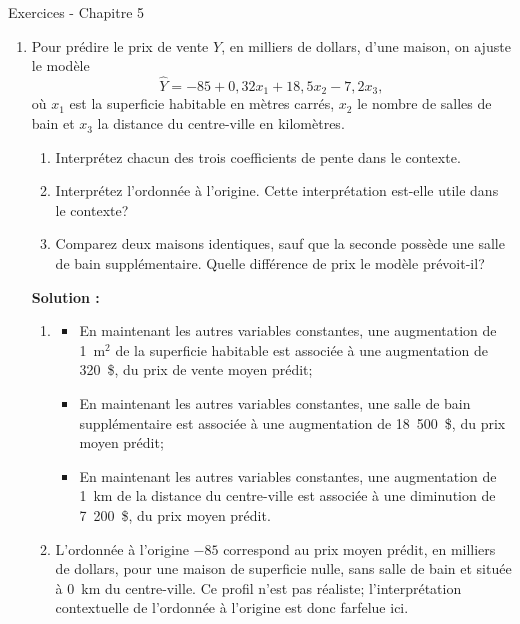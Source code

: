 \documentclass[letter, 11pt]{article}
\newcommand{\prof}[1]{\ifdefined\avecsolutions\par{\color{blue}\textbf{Solution :} #1}\par\fi}
\begin{document}
\vspace*{0.01 cm}
\begin{center}
{\Large Exercices - Chapitre 5}
\end{center}




\begin{enumerate}[leftmargin=*, wide, label=\bf Exercice \arabic*:]

\item Pour prédire le prix de vente $Y$, en milliers de dollars, d'une maison, on
ajuste le modèle
\[
  \widehat{Y}=-85+0{,}32x_1+18{,}5x_2-7{,}2x_3,
\]
où $x_1$ est la superficie habitable en mètres carrés, $x_2$ le nombre de
salles de bain et $x_3$ la distance du centre-ville en kilomètres.

\begin{enumerate}[label=\alph*)]
  \item Interprétez chacun des trois coefficients de pente dans le contexte.
  \item Interprétez l'ordonnée à l'origine. Cette interprétation est-elle
        utile dans le contexte?
  \item Comparez deux maisons identiques, sauf que la seconde possède une
        salle de bain supplémentaire. Quelle différence de prix le modèle
        prévoit-il?
\end{enumerate}


\prof{  \begin{enumerate}[label=\alph*)]
  \item 
  \begin{itemize}
    \item En maintenant les autres variables constantes, une augmentation de 1~m$^2$ de la superficie habitable est associée
          à une augmentation de  320~\$, du
          prix de vente moyen prédit;
    \item En maintenant les autres variables constantes, une salle de bain supplémentaire est associée à une augmentation de
           18~500~\$, du prix moyen prédit;
    \item En maintenant les autres variables constantes, une augmentation de 1~km de la distance du centre-ville est associée
          à une diminution de 7~200~\$, du prix
          moyen prédit.
  \end{itemize}

  \item L'ordonnée à l'origine $-85$ correspond au prix moyen prédit, en
        milliers de dollars, pour une maison de superficie nulle, sans salle
        de bain et située à 0~km du centre-ville. Ce profil n'est pas réaliste;
        l'interprétation contextuelle de l'ordonnée à l'origine est donc farfelue ici.


\end{enumerate}}
\end{enumerate}
\end{document}
